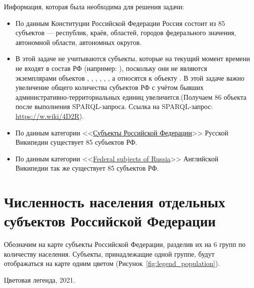 Информация, которая была необходима для решения задачи:
\begin{itemize}
  \item По данным Конституции Российской Федерации Россия состоит из 85 субъектов — республик, краёв, областей, городов федерального значения, автономной области, автономных округов.
  \item В этой задаче не учитываются субъекты, которые на текущий момент времени не входят в состав РФ (например: ), поскольку они не являются экземплярами объектов , , , , , , а относятся к объекту . В этой задаче важно увеличение общего количества субъектов РФ с учётом бывших административно-территориальных единиц увеличится.(Получаем 86 объекта после выполнения SPARQL-запроса. Ссылка на SPARQL-запрос: \href{https://w.wiki/4D2R}{https://w.wiki/4D2R}). 
  \item По данным категории <<\href{https://ru.wikipedia.org/wiki/Субъекты_Российской_Федерации}{Субъекты Российской Федерации}>> Русской Википедии существует 85 субъектов РФ.
  \item По данным категории <<\href{https://ru.wikipedia.org/wiki/en:Federal_subjects_of_Russia}{Federal subjects of Russia}>> Английской Википедии так же существует 85 субъектов РФ.
\end{itemize}

\section{Численность населения отдельных субъектов Российской Федерации}

Обозначим на карте субъекты Российской Федерации, разделив их на 6 групп по количеству населения. Субъекты, принадлежащие одной группе, будут отображаться на карте одним цветом (Рисунок~\ref{fig:legend_population}).

\begin{marginfigure}[0.0cm]
{
	\setlength{\fboxsep}{0pt}%
	\setlength{\fboxrule}{1pt}%
}
\caption [Цветовая легенда, 2021.]{Цветовая легенда, 2021.}%
\label{fig:legend_population}%
\end{marginfigure}

